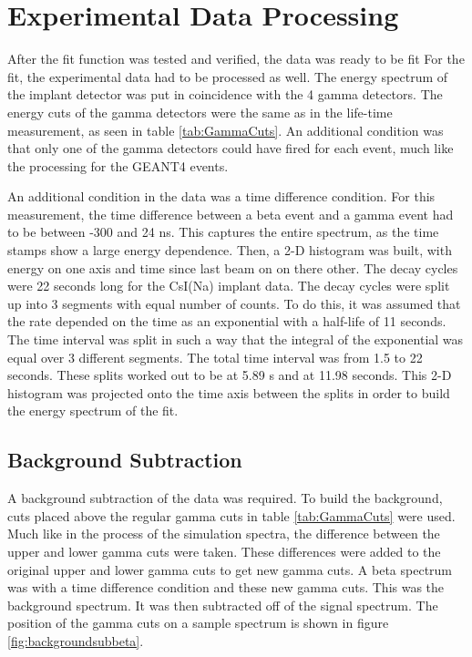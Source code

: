 \documentclass[../MaxHughesThesis.tex]{subfiles}
\begin{document}
\section{Experimental Data Processing}
After the fit function was tested and verified, the data was ready to be fit 
For the fit, the experimental data had to be processed as well. 
The energy spectrum of the implant detector was put in coincidence with the 4 gamma detectors.
The energy cuts of the gamma detectors were the same as in the life-time measurement, as seen in table \ref{tab:GammaCuts}.
An additional condition was that only one of the gamma detectors could have fired for each event, much like the processing for the GEANT4 events.

An additional condition in the data was a time difference condition.
For this measurement, the time difference between a beta event and a gamma event had to be between -300 and 24 ns.
This captures the entire spectrum, as the time stamps show a large energy dependence. 
Then, a 2-D histogram was built, with energy on one axis and time since last beam on on there other.
The decay cycles were 22 seconds long for the CsI(Na) implant data. 
The decay cycles were split up into 3 segments with equal number of counts.
To do this, it was assumed that the rate depended on the time as an exponential with a half-life of 11 seconds.
The time interval was split in such a way that the integral of the exponential was equal over 3 different segments.
The total time interval was from 1.5 to 22 seconds.
These splits worked out to be at 5.89 s and at 11.98 seconds. 
This 2-D histogram was projected onto the time axis between the splits in order to build the energy spectrum of the fit. 

\subsection{Background Subtraction}

A background subtraction of the data was required.
To build the background, cuts placed above the regular gamma cuts in table \ref{tab:GammaCuts} were used.
Much like in the process of the simulation spectra, the difference between the upper and lower gamma cuts were taken.
These differences were added to the original upper and lower gamma cuts to get new gamma cuts.
A beta spectrum was with a time difference condition and these new gamma cuts.
This was the background spectrum.
It was then subtracted off of the signal spectrum. 
The position of the gamma cuts on a sample spectrum is shown in figure \ref{fig:backgroundsubbeta}.
\end{document}
